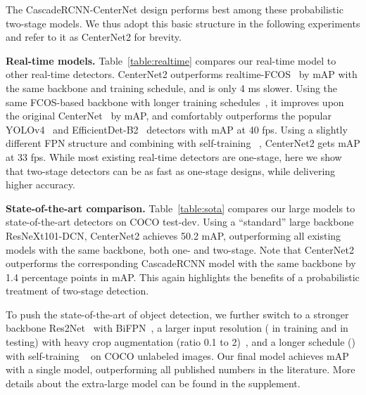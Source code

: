 \documentclass{article}
\renewcommand{\paragraph}[1]{\noindent\textbf{#1}}
\newcommand{\name}{CenterNet2 }
\begin{document}
The CascadeRCNN-CenterNet design performs best among these probabilistic two-stage models. We thus adopt this basic structure in the following experiments and refer to it as CenterNet2 for brevity.

\paragraph{Real-time models.}
Table~\ref{table:realtime} compares our real-time model to other real-time detectors.
CenterNet2 outperforms realtime-FCOS~\cite{tian2020fcos} by  mAP with the same backbone and training schedule, and is only 4 ms slower.
Using the same FCOS-based backbone with longer training schedules~\cite{tan2020efficientdet,bochkovskiy2020yolov4}, it improves upon the original CenterNet~\cite{zhou2019objects} by  mAP, and comfortably outperforms the popular YOLOv4~\cite{bochkovskiy2020yolov4} and EfficientDet-B2~\cite{tan2020efficientdet} detectors with  mAP at 40 fps.
Using a slightly different FPN structure and combining with self-training ~\cite{zoph2020rethinking}, CenterNet2 gets  mAP at 33 fps.
While most existing real-time detectors are one-stage, 
here we show that two-stage detectors can be as fast as one-stage designs, while delivering higher accuracy.

\paragraph{State-of-the-art comparison.}
Table~\ref{table:sota} compares our large models to state-of-the-art detectors on COCO test-dev.
Using a ``standard'' large backbone ResNeXt101-DCN, \name achieves 50.2 mAP, outperforming all existing models with the same backbone, both one- and two-stage. 
Note that CenterNet2 outperforms the corresponding CascadeRCNN model with the same backbone by 1.4 percentage points in mAP. This again highlights the benefits of a probabilistic treatment of two-stage detection.

To push the state-of-the-art of object detection, we further switch to a stronger backbone Res2Net~\cite{gao2019res2net} with BiFPN~\cite{tan2020efficientdet}, a larger input resolution ( in training and  in testing) with heavy crop augmentation (ratio 0.1 to 2)~\cite{tan2020efficientdet}, and a longer schedule () with self-training ~\cite{zoph2020rethinking} on COCO unlabeled images.
Our final model achieves  mAP with a single model, outperforming all published numbers in the literature. 
More details about the extra-large model can be found in the supplement.
\end{document}
